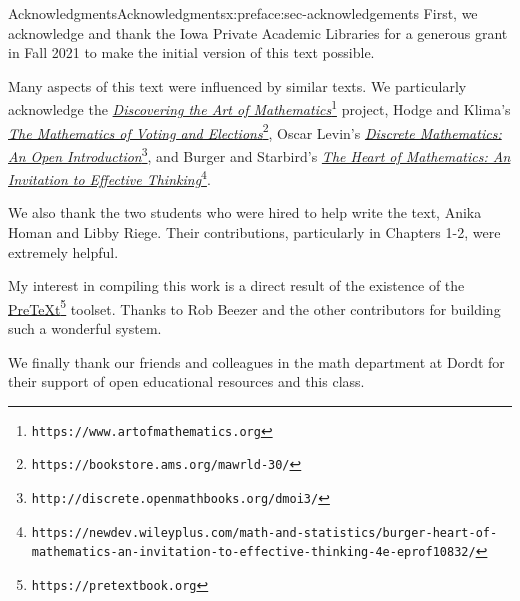 \documentclass[oneside,10pt,]{book}
\numberwithin{equation}{section}
\begin{document}
\begin{preface}{Acknowledgments}{}{Acknowledgments}{}{}{x:preface:sec-acknowledgements}
First, we acknowledge and thank the Iowa Private Academic Libraries for a generous grant in Fall 2021 to make the initial version of this text possible.%
\par
Many aspects of this text were influenced by similar texts. We particularly acknowledge the \href{https://www.artofmathematics.org}{\emph{Discovering the Art of Mathematics}}\footnote{\nolinkurl{https://www.artofmathematics.org}\label{g:fn:idp105544742321424}} project, Hodge and Klima's \href{https://bookstore.ams.org/mawrld-30/}{\emph{The Mathematics of Voting and Elections}}\footnote{\nolinkurl{https://bookstore.ams.org/mawrld-30/}\label{g:fn:idp105544742322320}}, Oscar Levin's \href{http://discrete.openmathbooks.org/dmoi3/}{\emph{Discrete Mathematics: An Open Introduction}}\footnote{\nolinkurl{http://discrete.openmathbooks.org/dmoi3/}\label{g:fn:idp105544742323216}}, and Burger and Starbird's \href{https://newdev.wileyplus.com/math-and-statistics/burger-heart-of-mathematics-an-invitation-to-effective-thinking-4e-eprof10832/}{\emph{The Heart of Mathematics: An Invitation to Effective Thinking}}\footnote{\nolinkurl{https://newdev.wileyplus.com/math-and-statistics/burger-heart-of-mathematics-an-invitation-to-effective-thinking-4e-eprof10832/}\label{g:fn:idp105544742324240}}.%
\par
We also thank the two students who were hired to help write the text, Anika Homan and Libby Riege. Their contributions, particularly in Chapters 1-2, were extremely helpful.%
\par
My interest in compiling this work is a direct result of the existence of the \href{https://pretextbook.org}{PreTeXt}\footnote{\nolinkurl{https://pretextbook.org}\label{g:fn:idp105544742325648}} toolset. Thanks to Rob Beezer and the other contributors for building such a wonderful system.%
\par
We finally thank our friends and colleagues in the math department at Dordt for their support of open educational resources and this class.%
\end{preface}
\setcounter{tocdepth}{0}
\renewcommand*\contentsname{Contents}
\tableofcontents
\mainmatter
%
%
\typeout{************************************************}
\typeout{************************************************}
%
\end{document}
